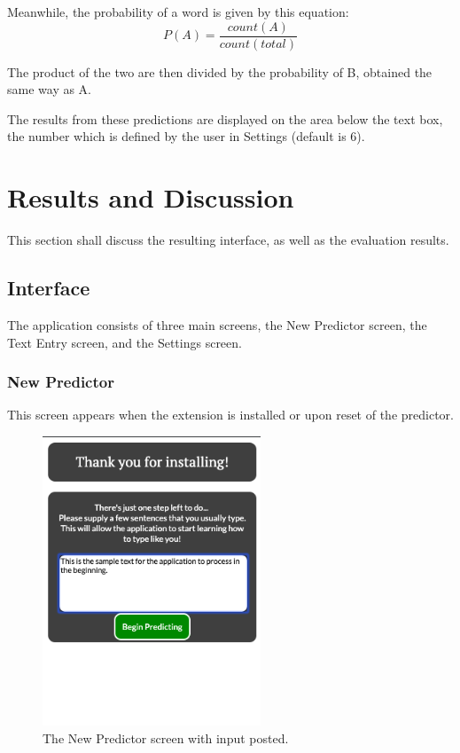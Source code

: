 \documentclass[journal]{./IEEE/IEEEtran}
\begin{document}
Meanwhile, the probability of a word is given by this equation:
$$ P(A) = \frac{count(A)}{count(total)} $$

The product of the two are then divided by the probability of B, obtained the same way as A.

The results from these predictions are displayed on the area below the text box, the number which is defined by the user in Settings (default is 6).

\section{Results and Discussion}
This section shall discuss the resulting interface, as well as the evaluation results.

\subsection{Interface}
The application consists of three main screens, the New Predictor screen, the Text Entry screen, and the Settings screen.

\subsubsection{New Predictor}
This screen appears when the extension is installed or upon reset of the predictor.

\begin{figure}[!ht]
\begin{center}

\includegraphics[width=65mm]{images/initial-input.png}
\caption{The New Predictor screen with input posted.}

\end{center}
\end{figure}
\end{document}
